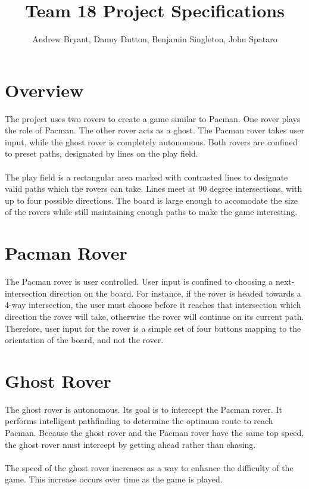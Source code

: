 \documentclass[12pt,letterpaper]{article}
\title{Team 18 Project Specifications}
\author{Andrew Bryant, Danny Dutton, Benjamin Singleton, John Spataro}
\begin{document}
\maketitle

\section{Overview}
The project uses two rovers to create a game similar to Pacman. One rover plays the role of Pacman. The other rover acts as a ghost. The Pacman rover takes user input, while the ghost rover is completely autonomous. Both rovers are confined to preset paths, designated by lines on the play field. 

\paragraph{}
The play field is a rectangular area marked with contrasted lines to designate valid paths which the rovers can take. Lines meet at 90 degree intersections, with up to four possible directions. The board is large enough to accomodate the size of the rovers while still maintaining enough paths to make the game interesting.

\section{Pacman Rover}
The Pacman rover is user controlled. User input is confined to choosing a next-intersection direction on the board. For instance, if the rover is headed towards a 4-way intersection, the user must choose before it reaches that intersection which direction the rover will take, otherwise the rover will continue on its current path. Therefore, user input for the rover is a simple set of four buttons mapping to the orientation of the board, and not the rover.

\section{Ghost Rover}
The ghost rover is autonomous. Its goal is to intercept the Pacman rover. It performs intelligent pathfinding to determine the optimum route to reach Pacman. Because the ghost rover and the Pacman rover have the same top speed, the ghost rover must intercept by getting ahead rather than chasing. 

\paragraph{}
The speed of the ghost rover increases as a way to enhance the difficulty of the game. This increase occurs over time as the game is played.
\end{document}
